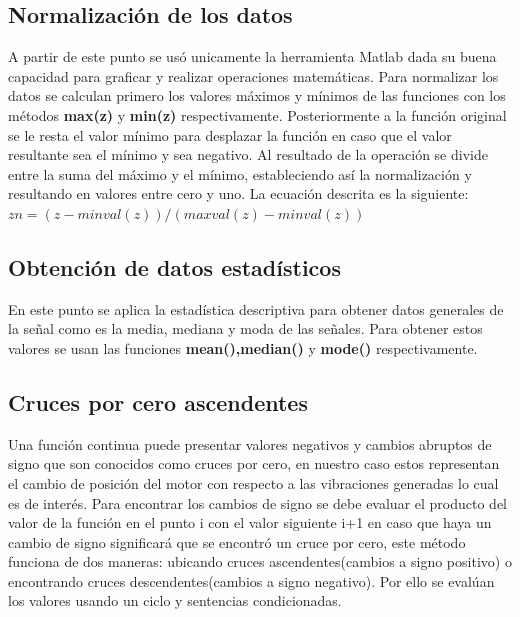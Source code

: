 \documentclass[11pt,a4paper]{article}
\begin{document}
\subsection{Normalización de los datos}
A partir de este punto se usó unicamente la herramienta Matlab dada su buena capacidad para graficar y realizar operaciones matemáticas. Para normalizar los datos se calculan primero los valores máximos y mínimos de las funciones con los métodos \textbf{max(z)} y \textbf{min(z)} respectivamente. Posteriormente a la función original se le resta el valor mínimo para desplazar la función en caso que el valor resultante sea el mínimo y sea negativo. Al resultado de la operación se divide entre la suma del máximo y el mínimo, estableciendo así la normalización y resultando en valores entre cero y uno. La ecuación descrita es la siguiente: $zn = (z-minval(z))/(maxval(z)-minval(z))$

\subsection{Obtención de datos estadísticos}
En este punto se aplica la estadística descriptiva para obtener datos generales de la señal como es la media, mediana y moda de las señales. Para obtener estos valores se usan las funciones \textbf{mean(),median()} y \textbf{mode()} respectivamente.

\subsection{Cruces por cero ascendentes}
Una función continua puede presentar valores negativos y cambios abruptos de signo que son conocidos como cruces por cero, en nuestro caso estos representan el cambio de posición del motor con respecto a las vibraciones generadas lo cual es de interés. Para encontrar los cambios de signo se debe evaluar el producto del valor de la función en el punto i con el valor siguiente i+1 en caso que haya un cambio de signo significará que se encontró un cruce por cero, este método funciona de dos maneras: ubicando cruces ascendentes(cambios a signo positivo) o encontrando cruces descendentes(cambios a signo negativo). Por ello se evalúan los valores usando un ciclo y sentencias condicionadas.
\end{document}
